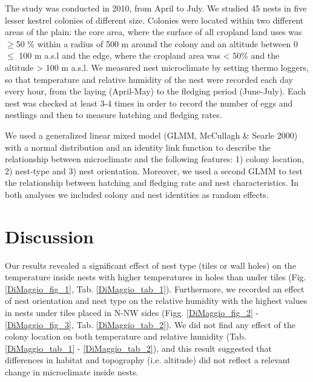 The study was conducted in 2010, from April to July. We studied 45 nests
in five lesser kestrel colonies of different size. Colonies were
located within two different areas of the plain: the core area, where
the surface of all cropland land uses was ${\geq}$50 \% within a radius
of 500 m around the colony and an altitude between 0 ${\leq}$ 100 m
a.s.l and the edge, where the cropland area was {\textless} 50\% and
the altitude {\textgreater} 100 m a.s.l. We measured nest microclimate
by setting thermo loggers, so that temperature and relative humidity of
the nest were recorded each day every hour, from the laying (April-May)
to the fledging period (June-July). Each nest was checked at least 3-4
times in order to record the number of eggs and nestlings and then to
measure hatching and fledging rates. 

We used a generalized linear mixed model (GLMM, McCullagh \& Searle
2000) with a normal distribution and an identity link function to
describe the relationship between microclimate and the following
features: 1) colony location, 2) nest-type and 3) nest orientation.
Moreover, we used a second GLMM to test the relationship between
hatching and fledging rate and nest characteristics. In both analyses
we included colony and nest identities as random effects.

\section*{Discussion}

Our results revealed a significant effect of nest type (tiles or wall
holes) on the temperature inside nests with higher temperatures in
holes than under tiles (Fig. \ref{DiMaggio_fig_1}, Tab. \ref{DiMaggio_tab_1}). Furthermore, we recorded an
effect of nest orientation and nest type on the relative humidity with
the highest values in nests under tiles placed in N-NW sides (Figg. \ref{DiMaggio_fig_2} -
\ref{DiMaggio_fig_3}, Tab. \ref{DiMaggio_tab_2}). We did not find any effect of the colony location on both
temperature and relative humidity (Tab. \ref{DiMaggio_tab_1} - \ref{DiMaggio_tab_2}), and this result
suggested that differences in habitat and topography (i.e. altitude)
did not reflect a relevant change in microclimate inside nests.

